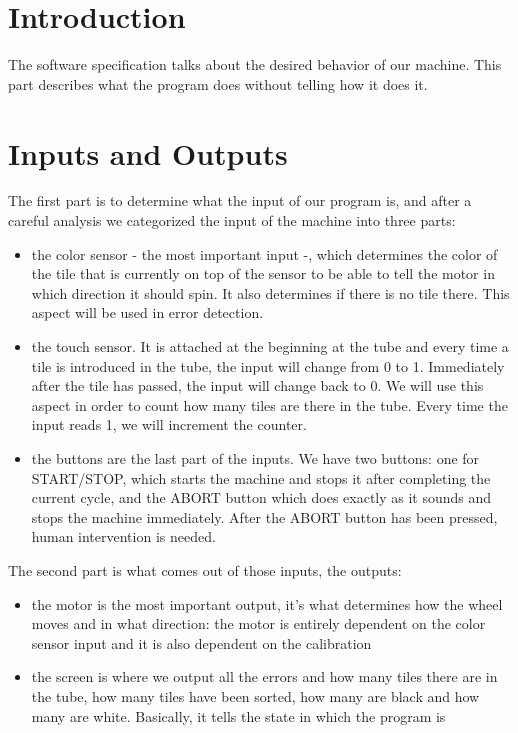 \section{Introduction}

The software specification talks about the desired behavior of our machine. This part describes what the program does without telling how it does it.

\section{Inputs and Outputs}

The first part is to determine what the input of our program is, and after a careful analysis we categorized the input of the machine into three parts: 
\begin{itemize}
\item the color sensor - the most important input -, which determines the color of the tile that is currently on top of the sensor to be able to tell the motor in which direction it should spin. It also determines if there is no tile there. This aspect will be used in error detection.
\item the touch sensor. It is attached at the beginning at the tube and every time a tile is introduced in the tube, the input will change from 0 to 1. Immediately after the tile has passed, the input will change back to 0. We will use this aspect in order to count how many tiles are there in the tube. Every time the input reads 1, we will increment the counter.
\item the buttons are the last part of the inputs. We have two buttons: one for START/STOP, which starts the machine and stops it after completing the current cycle, and the ABORT button which does exactly as it sounds and stops the machine immediately. After the ABORT button has been pressed, human intervention is needed.
\end{itemize}

The second part is what comes out of those inputs, the outputs:

\begin{itemize}
\item the motor is the most important output, it’s what determines how the wheel moves and in what direction: the motor is entirely dependent on the color sensor input and it is also dependent on the calibration
\item the screen is where we output all the errors and how many tiles there are in the tube, how many tiles have been sorted, how many are black and how many are white. Basically, it tells the state in which the program is
\end{itemize}

